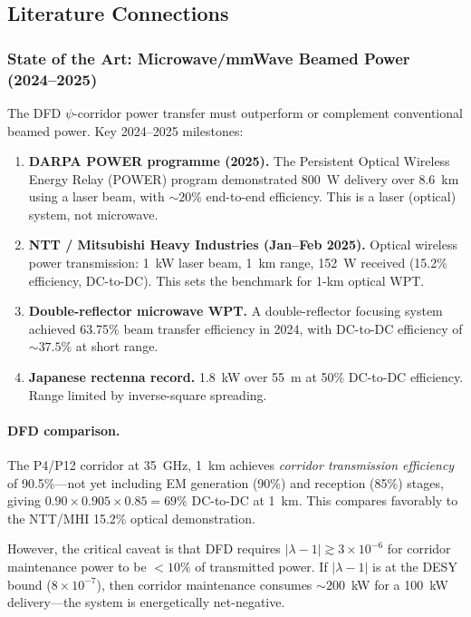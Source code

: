 \documentclass[aps,prd,twocolumn,superscriptaddress,nofootinbib]{revtex4-2}
\begin{document}
\subsection{Literature Connections}
\label{sec:literature}

\subsubsection{State of the Art: Microwave/mmWave Beamed Power (2024--2025)}

The DFD $\psi$-corridor power transfer must outperform or complement
conventional beamed power.  Key 2024--2025 milestones:

\begin{enumerate}
\item \textbf{DARPA POWER programme (2025).}  The Persistent Optical Wireless
Energy Relay (POWER) program demonstrated 800~W delivery over 8.6~km using a
laser beam, with $\sim 20\%$ end-to-end efficiency.  This is a laser
(optical) system, not microwave.

\item \textbf{NTT / Mitsubishi Heavy Industries (Jan--Feb 2025).}  Optical
wireless power transmission: 1~kW laser beam, 1~km range, 152~W received
(15.2\% efficiency, DC-to-DC).  This sets the benchmark for 1-km optical WPT.

\item \textbf{Double-reflector microwave WPT.}  A double-reflector focusing
system achieved 63.75\% beam transfer efficiency in 2024, with DC-to-DC
efficiency of $\sim 37.5\%$ at short range.

\item \textbf{Japanese rectenna record.}  1.8~kW over 55~m at 50\% DC-to-DC
efficiency.  Range limited by inverse-square spreading.
\end{enumerate}

\paragraph{DFD comparison.}
The P4/P12 corridor at 35~GHz, 1~km achieves \emph{corridor transmission
efficiency} of 90.5\%---not yet including EM generation (90\%) and reception
(85\%) stages, giving $0.90\times0.905\times0.85 = 69\%$ DC-to-DC at 1~km.
This compares favorably to the NTT/MHI 15.2\% optical demonstration.

However, the critical caveat is that DFD requires $|\lambda-1| \gtrsim 3\times10^{-6}$
for corridor maintenance power to be $< 10\%$ of transmitted power.  If
$|\lambda-1|$ is at the DESY bound ($8\times10^{-7}$), then corridor maintenance
consumes $\sim 200$~kW for a 100~kW delivery---the system is energetically
net-negative.
\end{document}
